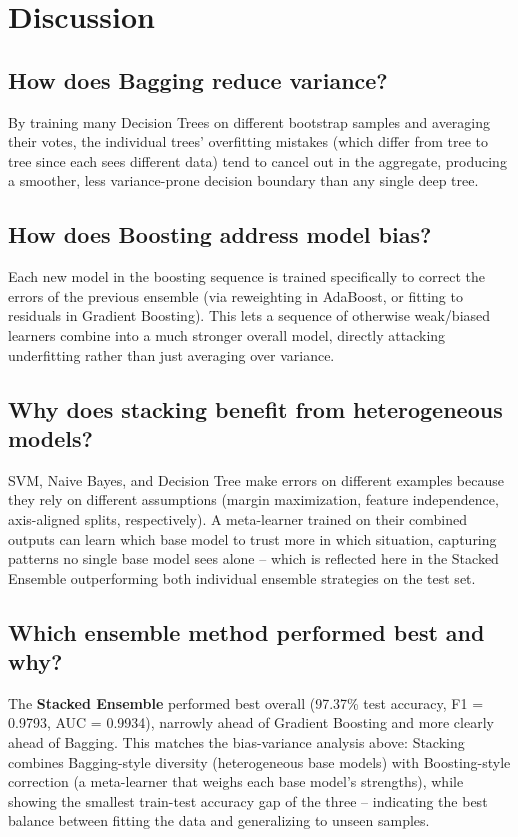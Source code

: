 \documentclass[12pt,a4paper]{article}
\begin{document}
\section{Discussion}

\subsection*{How does Bagging reduce variance?}
By training many Decision Trees on different bootstrap samples and averaging
their votes, the individual trees' overfitting mistakes (which differ from tree to
tree since each sees different data) tend to cancel out in the aggregate,
producing a smoother, less variance-prone decision boundary than any single deep
tree.

\subsection*{How does Boosting address model bias?}
Each new model in the boosting sequence is trained specifically to correct the
errors of the previous ensemble (via reweighting in AdaBoost, or fitting to
residuals in Gradient Boosting). This lets a sequence of otherwise weak/biased
learners combine into a much stronger overall model, directly attacking
underfitting rather than just averaging over variance.

\subsection*{Why does stacking benefit from heterogeneous models?}
SVM, Naive Bayes, and Decision Tree make errors on different examples because
they rely on different assumptions (margin maximization, feature independence,
axis-aligned splits, respectively). A meta-learner trained on their combined
outputs can learn which base model to trust more in which situation, capturing
patterns no single base model sees alone -- which is reflected here in the
Stacked Ensemble outperforming both individual ensemble strategies on the test
set.

\subsection*{Which ensemble method performed best and why?}
The \textbf{Stacked Ensemble} performed best overall (97.37\% test accuracy, F1 =
0.9793, AUC = 0.9934), narrowly ahead of Gradient Boosting and more clearly ahead
of Bagging. This matches the bias-variance analysis above: Stacking combines
Bagging-style diversity (heterogeneous base models) with Boosting-style
correction (a meta-learner that weighs each base model's strengths), while
showing the smallest train-test accuracy gap of the three -- indicating the best
balance between fitting the data and generalizing to unseen samples.
\end{document}
